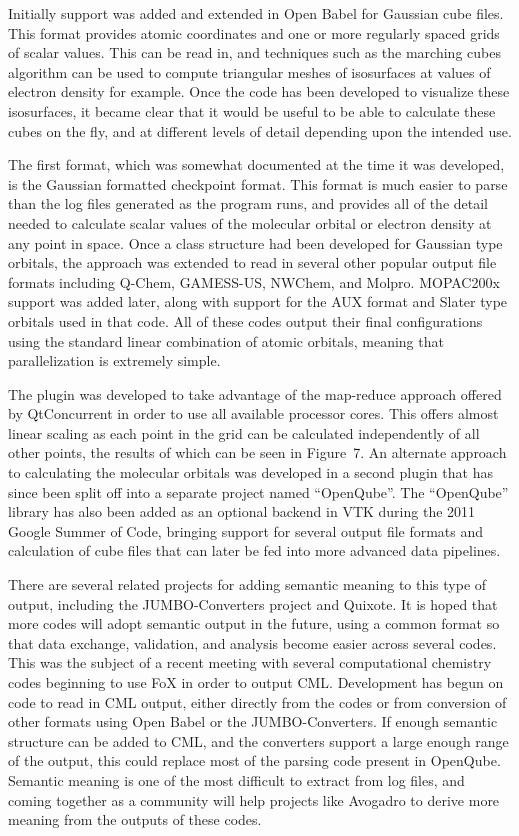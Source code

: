 \documentclass[10pt]{bmc_article}
\newenvironment{bmcformat}{\begin{raggedright}
  \baselineskip20pt\sloppy\setboolean{publ}{false}}{\end{raggedright}
  \baselineskip20pt\sloppy}
\begin{document}
\begin{bmcformat}
Initially support was added and extended in Open Babel for Gaussian cube files.
This format provides atomic coordinates and one or more regularly spaced grids
of scalar values. This can be read in, and techniques such as the marching cubes
algorithm can be used to compute triangular meshes of isosurfaces at values of
electron density for example. Once the code has been developed to visualize these
isosurfaces, it became clear that it would be useful to be able to calculate these cubes
on the fly, and at different levels of detail depending upon the intended use.

The first format, which was somewhat documented at the time it was developed, is the
Gaussian formatted checkpoint format. This format is much easier to parse than the
log files generated as the program runs, and provides all of the detail needed to
calculate scalar values of the molecular orbital or electron density at any point in space.
Once a class structure had been developed for Gaussian type orbitals, the approach
was extended to read in several other popular output file formats including Q-Chem,
GAMESS-US, NWChem, and Molpro. MOPAC200x support was added later, along with
support for the AUX format and Slater type orbitals used in that code. All of these
codes output their final configurations using the standard linear combination of
atomic orbitals, meaning that parallelization is extremely simple.

The plugin was developed to take advantage of the map-reduce approach offered
by QtConcurrent in order to use all available processor cores. This offers almost
linear scaling as each point in the grid can be calculated independently of all other
points, the results of which can be seen in Figure~7.
An alternate approach to calculating the molecular orbitals was developed
in a second plugin that has since been split off into a separate
project named ``OpenQube''. The ``OpenQube'' library has also been added as an
optional backend in VTK during the 2011 Google Summer of Code, bringing support
for several output file formats and calculation of cube files that can later be
fed into more advanced data pipelines.

There are several related projects for adding semantic meaning to this type of output,
including the JUMBO-Converters project and Quixote. It is hoped that more codes
will adopt semantic output in the future, using a common format so that data exchange,
validation, and analysis become easier across several codes. This was the subject of
a recent meeting with several computational chemistry codes beginning to use FoX
in order to output CML. Development has begun on code to read in CML output,
either directly from the codes or from conversion of other formats using Open Babel
or the JUMBO-Converters. If enough semantic structure can be added to CML, and the
converters support a large enough range of the output, this could replace most of
the parsing code present in OpenQube. Semantic meaning is one of the most
difficult to extract from log files, and coming together as a community will help
projects like Avogadro to derive more meaning from the outputs of these codes.


\end{bmcformat}
\end{document}
